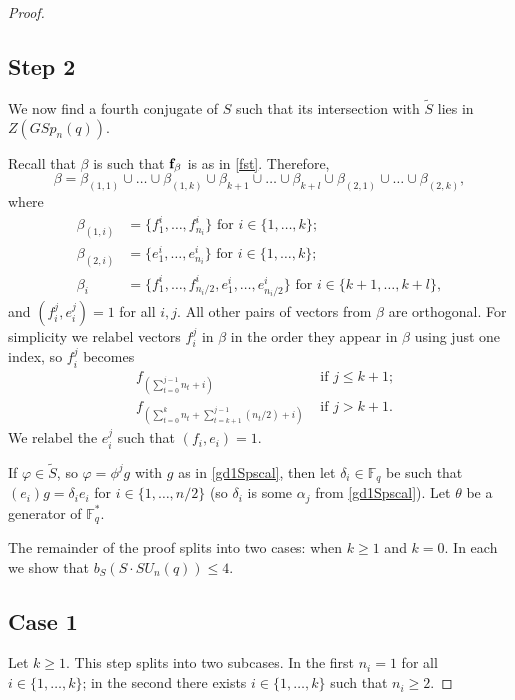 \begin{proof}
 
\subsection*{Step 2} We now find a fourth conjugate of $S$ such that its intersection with $\tilde{S}$ lies in  $Z(GSp_n(q)).$

Recall that $\beta$ is such that 
$\bf f_{\beta}$ is as in \eqref{fst}. Therefore,
 $$\beta= \beta_{(1,1)} \cup \ldots \cup \beta_{(1,k)} \cup \beta_{k+1} \cup \ldots \cup \beta_{k+l} \cup \beta_{(2,1)} \cup \ldots \cup \beta_{(2,k)},$$
where 
\begin{equation}\label{betaij}
\begin{split}
\beta_{(1,i)} & =\{f_1^{i}, \ldots, f_{n_i}^i\} \text{ for } i \in \{1, \ldots, k\}; \\
\beta_{(2,i)} & =\{e_1^{i}, \ldots, e_{n_i}^i\} \text{ for } i \in \{1, \ldots, k\}; \\
\beta_{i} & =\{f_1^{i}, \ldots, f_{n_i/2}^i,e_1^{i}, \ldots, e_{n_i/2}^{i}\} \text{ for } i \in \{k+1, \ldots, k+l\},
\end{split}
\end{equation}
and $(f_i^j,e_i^j)=1$ for all $i,j.$ All other pairs of vectors from $\beta$ are orthogonal. For simplicity we relabel vectors $f_i^j$ in $\beta$ in the order they appear in $\beta$ using just one index, so $f_i^j$ becomes 
\begin{equation*}
\begin{aligned}
& f_{(\sum_{t=0}^{j-1} n_t +i)} & \text{ if } j \le k+1; \\
& f_{(\sum_{t=0}^{k} n_t +\sum_{t=k+1}^{j-1} (n_t/2) +i)} & \text{ if } j > k+1. 
\end{aligned}
\end{equation*}
We relabel the $e_i^j$ such that $(f_i,e_i)=1.$

If $\varphi \in \tilde{S}$, so $\varphi = \phi^j g$ with $g$ as in \eqref{gd1Spscal}, then let $\delta_i \in \mathbb{F}_q$ be such that $(e_i)g=\delta_i e_i$ for $i \in\{1, \ldots, n/2\}$ (so $\delta_i$ is some $\alpha_j$ from \eqref{gd1Spscal}).
 Let $\theta$ be a generator of $\mathbb{F}_q^*.$ 


The remainder of the proof splits into two cases: 
when $k \ge 1$ and
 $k=0.$
  In each   we show that $b_S(S \cdot SU_n(q))\le 4.$ 



\subsection*{Case 1} Let $k\ge 1$. This step splits into two  subcases. In the first  $n_i=1$ for all $i \in \{1, \ldots, k\}$; in the second  there exists $i \in \{1, \ldots, k\}$ such that $n_i \ge 2.$


\end{proof}
